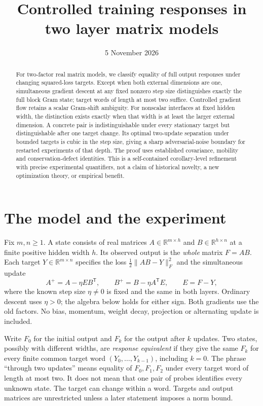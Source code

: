 \documentclass[11pt]{article}
\title{Controlled training responses in two layer matrix models}
\author{}
\date{5 November 2026}
\theoremstyle{remark}\newtheorem{remark}[theorem]{Remark}
\newcommand{\R}{\mathbb R}
\begin{document}
\maketitle
\begin{abstract}
For two-factor real matrix models, we classify equality of full output
responses under changing squared-loss targets. Except when both external
dimensions are one, simultaneous gradient descent at any fixed nonzero
step size distinguishes exactly the full block Gram state; target words
of length at most two suffice. Controlled gradient flow retains a scalar
Gram-shift ambiguity. For nonscalar interfaces at fixed hidden width, the distinction exists
exactly when that width is at least the larger external dimension. A concrete pair is
indistinguishable under every stationary target but distinguishable after
one target change. Its optimal two-update separation under bounded targets
is cubic in the step size, giving a sharp adversarial-noise boundary for
restarted experiments of that depth. The proof uses established covariance,
mobility and conservation-defect identities. This is a self-contained
corollary-level refinement with precise experimental quantifiers, not a
claim of historical novelty, a new optimization theory, or empirical benefit.
\end{abstract}

\section{The model and the experiment}
Fix $m,n\geq1$. A state consists of real matrices
$A\in\R^{m\times h}$ and $B\in\R^{h\times n}$ at a finite positive hidden
width $h$. Its observed output is the \emph{whole} matrix $F=AB$.
Each target $Y\in\R^{m\times n}$ specifies the loss
$\tfrac12\|AB-Y\|_F^2$ and the simultaneous update
\begin{equation}\label{eq:factor-step}
 A^+=A-\eta EB^{\mathsf T},\qquad
 B^+=B-\eta A^{\mathsf T}E,\qquad E=F-Y,
\end{equation}
where the known step size $\eta\ne0$ is fixed and the same in both layers.
Ordinary descent uses $\eta>0$; the algebra below holds for either sign.
Both gradients use the old factors. No bias, momentum, weight decay,
projection or alternating update is included.

Write $F_0$ for the initial output and $F_k$ for the output after $k$
updates. Two states, possibly with different widths, are \emph{response
equivalent} if they give the same $F_k$ for every finite common target
word $(Y_0,\ldots,Y_{k-1})$, including $k=0$. The phrase ``through two
updates'' means equality of $F_0,F_1,F_2$ under every target word of length
at most two. It does not mean that one pair of probes identifies every
unknown state. The target can change within a word. Targets and output
matrices are unrestricted unless a later statement imposes a norm bound.
\end{document}
